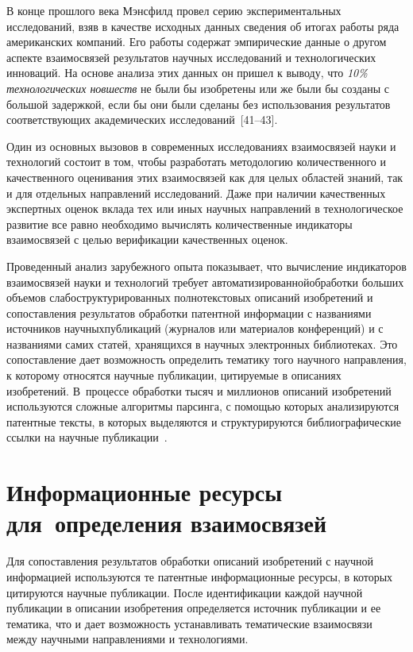 \begin{multicols}{2}
    В конце прошлого века Мэнсфилд провел серию экспериментальных исследований, взяв в 
качестве исходных данных сведения об итогах работы ряда американских компаний. Его 
работы содержат эмпирические данные о другом аспекте взаимосвязей результатов научных 
исследований и технологических инноваций. На основе анализа этих данных он пришел к 
выводу, что \textit{10\% технологических новшеств} не были бы изобретены или же были бы 
созданы с большой задержкой, если бы они были сделаны без использования результатов 
соответствующих академических исследований~[41--43].
    
    Один из основных вызовов в современных исследованиях взаимосвязей науки и 
технологий состоит в том, чтобы разработать методологию количественного и качественного 
оценивания этих взаимосвязей как для целых областей знаний, так и для отдельных 
направлений исследований. Даже при наличии качественных экспертных оценок вклада тех или 
иных научных направлений в технологическое развитие все равно необходимо вы\-чис\-лять 
количественные индикаторы взаимосвязей с целью верификации качественных оценок.
    
    Проведенный анализ зарубежного опыта по\-ка\-зы\-вает, что вычисление индикаторов 
\mbox{взаимосвязей} науки и технологий требует автоматизированной\linebreak обработки больших объемов 
слабоструктурированных полнотекстовых описаний изобретений и сопоставления результатов 
обработки патентной информации с названиями источников научных\linebreak пуб\-ли\-ка\-ций (журналов 
или материалов конференций) и с названиями самих статей, хранящихся в научных 
электронных библиотеках. Это сопоставление дает возможность определить тематику того 
научного направления, к которому относятся научные пуб\-ли\-ка\-ции, цитируемые в описаниях 
изобретений. В~процессе обработки тысяч и миллионов описаний изобретений используются 
сложные алгоритмы парсинга, с помощью которых анализируются патентные тексты, в 
которых выделяются и структурируются библиографические ссылки на научные 
публикации~\cite{38-zat}.

\section{Информационные ресурсы для~определения взаимосвязей}

  Для сопоставления результатов обработки описаний изобретений с научной информацией 
используются те патентные информационные ресурсы, в которых цитируются научные 
публикации. После идентификации каждой научной публикации в описании изобретения 
определяется источник публикации и ее тематика, что и дает возможность устанавливать 
тематические взаимосвязи между научными направлениями и технологиями.


\end{multicols}
